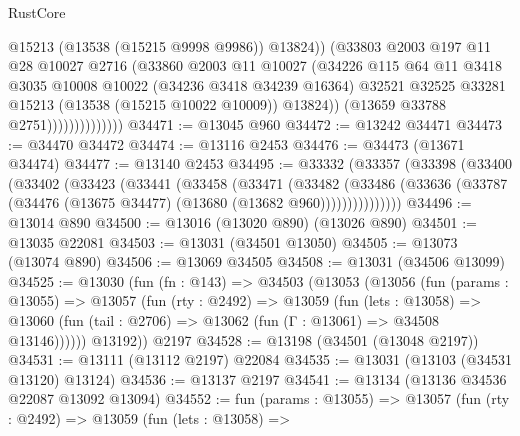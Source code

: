 \begin{lexlean}{RustCore}
\begin{coremodule}
                                @15213
                                (@13538 (@15215 @9998 @9986))
                                @13824))
                            (@33803
                              @2003
                              @197
                              @11
                              @28
                              @10027
                              @2716
                              (@33860
                                @2003
                                @11
                                @10027
                                (@34226
                                  @115
                                  @64
                                  @11
                                  @3418
                                  @3035
                                  @10008
                                  @10022
                                  (@34236 @3418 @34239 @16364)
                                  @32521
                                  @32525
                                  @33281
                                  @15213
                                  (@13538 (@15215 @10022 @10009))
                                  @13824))
                              (@13659 @33788 @2751))))))))))))))
@34471 := @13045 @960
@34472 := @13242 @34471
@34473 := @34470 @34472
@34474 := @13116 @2453
@34476 := @34473 (@13671 @34474)
@34477 := @13140 @2453
@34495 := @33332
    (@33357
      (@33398
        (@33400
          (@33402
            (@33423
              (@33441
                (@33458
                  (@33471
                    (@33482
                      (@33486
                        (@33636 (@33787 (@34476 (@13675 @34477) (@13680 (@13682 @960)))))))))))))))
@34496 := @13014 @890
@34500 := @13016 (@13020 @890) (@13026 @890)
@34501 := @13035 @22081
@34503 := @13031 (@34501 @13050)
@34505 := @13073 (@13074 @890)
@34506 := @13069 @34505
@34508 := @13031 (@34506 @13099)
@34525 := @13030
    (fun (fn : @143) =>
    @34503
      (@13053
        (@13056
          (fun (params : @13055) =>
          @13057
            (fun (rty : @2492) =>
            @13059
              (fun (lets : @13058) =>
              @13060 (fun (tail : @2706) => @13062 (fun (Γ : @13061) => @34508 @13146))))))
        @13192))
    @2197
@34528 := @13198 (@34501 (@13048 @2197))
@34531 := @13111 (@13112 @2197) @22084
@34535 := @13031 (@13103 (@34531 @13120) @13124)
@34536 := @13137 @2197
@34541 := @13134 (@13136 @34536 @22087 @13092 @13094)
@34552 := fun (params : @13055) =>
  @13057
    (fun (rty : @2492) =>
    @13059
      (fun (lets : @13058) =>

\end{coremodule}
\end{lexlean}
